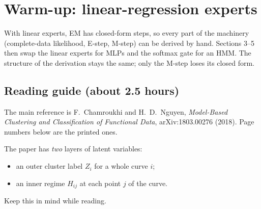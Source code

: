 \section{Warm-up: linear-regression experts}

With linear experts, EM has closed-form steps, so every part of the machinery (complete-data likelihood, E-step, M-step) can be derived by hand. Sections 3--5 then swap the linear experts for MLPs and the softmax gate for an HMM. The structure of the derivation stays the same; only the M-step loses its closed form.

\subsection{Reading guide (about 2.5 hours)}

The main reference is F.~Chamroukhi and H.~D.~Nguyen, \emph{Model-Based Clustering and Classification of Functional Data}, arXiv:1803.00276 (2018). Page numbers below are the printed ones.

The paper has \emph{two} layers of latent variables:
\begin{itemize}
  \item an outer cluster label $Z_i$ for a whole curve $i$;
  \item an inner regime $H_{ij}$ at each point $j$ of the curve.
\end{itemize}
Keep this in mind while reading.

